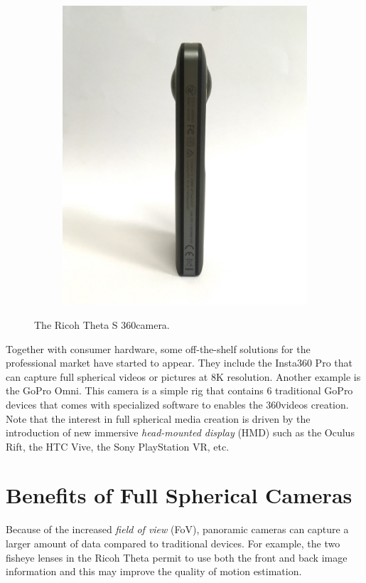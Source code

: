 \begin{figure}[htb]
\begin{subfigure}{0.3\textwidth}
	\end{subfigure}
	\begin{subfigure}{0.3\textwidth}
		\centering
		\includegraphics[width=\textwidth]{img/theta3}
	\end{subfigure}
	\caption{The Ricoh Theta S 360\degree camera.}
    \label{fig:ricoh_theta}
\end{figure}

Together with consumer hardware, some off-the-shelf
solutions for the professional market have started to appear. They include the Insta360
Pro that can capture full spherical videos or pictures
at 8K resolution.
Another example is the GoPro Omni. This camera is a simple 
rig that contains 6 traditional GoPro devices that comes with 
specialized software to enables the 360\degree videos creation. Note that the interest in full spherical media creation is driven by the introduction of new immersive \textit{head-mounted display} (HMD) such as the Oculus Rift, the HTC Vive, the Sony PlayStation VR, etc.

\section{Benefits of Full Spherical Cameras}
Because of the increased \textit{field of view} (FoV), panoramic cameras can capture a larger amount of data compared to traditional devices. For example, the two fisheye lenses in the Ricoh Theta permit to use both the front and back image information and this may improve the quality of motion estimation.

